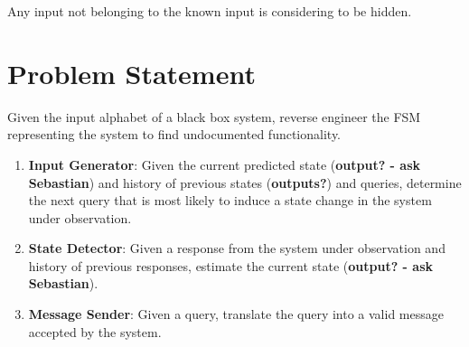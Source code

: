\documentclass[11pt, a4paper]{article}
\begin{document}
Any input not belonging to the known input is considering to be hidden.

\section*{Problem Statement} 

Given the input alphabet of a black box system, reverse engineer the FSM representing the system to find undocumented functionality.

\begin{enumerate}
    \item \textbf{Input Generator}: Given the current predicted state (\textbf{output? - ask Sebastian}) and history of previous states (\textbf{outputs?}) and queries, determine the next query that is most likely to induce a state change in the system under observation.
    \item \textbf{State Detector}: Given a response from the system under observation and history of previous responses, estimate the current state (\textbf{output? - ask Sebastian}).
    \item \textbf{Message Sender}: Given a query, translate the query into a valid message accepted by the system.
\end{enumerate}
\end{document}
